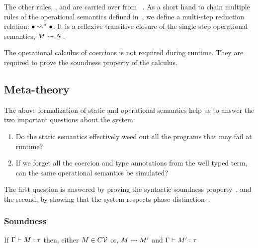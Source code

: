 \documentclass[screen,nonacm,manuscript,review]{acmart} %
\begin{document}
The other rules, \trule{$\beta$},  and 
are carried over from \SF~\cite{pierce_tapl_2002}. As a short hand to chain
multiple rules of the operational semantics defined in~,
we define a  multi-step reduction relation: $\bullet \rightsquigarrow^* \bullet$. It is a
reflexive transitive closure of the single step operational semantics,
$M \rightsquigarrow N$.

\newcommand\MultiStepRefl{
    \ib{\irule[\trule{$\rightsquigarrow^*-r$}];
      {\manystepsto \Tm \Tm}
    }
}
\newcommand\MultiStepLift{
    \ib{\irule[\trule{$\rightsquigarrow^*-r$}]
      {\stepsto \Tm N};
      {\manystepsto \Tm N}
    }
}
\newcommand\MultiStepTrans{
    \ib{\irule[\trule{$\rightsquigarrow^*-t$}]
      {\stepsto \Tm {\Tm'}}
      {\manystepsto {\Tm'} N};
      {\manystepsto \Tm N}
    }
}

The operational calculus of coercions is not required during runtime.
They are required to prove the soundness property of the calculus.

\subsection{Meta-theory}
The above formalization of static and operational semantics
help us to answer the two important questions about the system:
\begin{enumerate}
\item Do the static semantics effectively weed out
    all the programs that may fail at runtime?
\item If we forget all the coercion and type annotations
    from the well typed term, can the same operational semantics be simulated?
\end{enumerate}

The first question is answered by proving the syntactic soundness property~\cite{wright_syntactic_1994},
and the second, by showing that the system respects phase distinction~\cite{harper_higher-order_1989}.

\subsubsection{Soundness}
\begin{claim}\label{claim:sfc-ty-safety}
 If $\Gamma \vdash M : \tau$ then, either $M \in C\mathcal{V}$ or, $M \rightsquigarrow M'$ and
 $\Gamma \vdash M' : \tau$
\end{claim}
\end{document}
